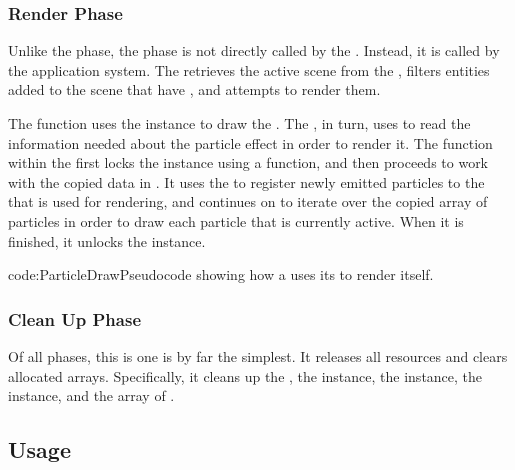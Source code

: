 \subsubsection{Render Phase}

Unlike the  phase, the  phase is not directly called by the . Instead, it is called by the  application system. The  retrieves the active scene from the , filters entities added to the scene that have , and attempts to render them. 

The  function uses the  instance to draw the . The , in turn, uses  to read the information needed about the particle effect in order to render it. The  function within the  first locks the  instance using a  function, and then proceeds to work with the copied data in . It uses the  to register newly emitted particles to the  that is used for rendering, and continues on to iterate over the copied array of particles in order to draw each particle that is currently active. When it is finished, it unlocks the  instance.

{code:ParticleDraw}{Pseudocode showing how a  uses its  to render itself.}

\subsubsection{Clean Up Phase}

Of all phases, this is one is by far the simplest. It releases all resources and clears allocated arrays. Specifically, it cleans up the , the  instance, the  instance, the  instance, and the array of .

\subsection{Usage}\label{ssec:cs_pec_usage}

